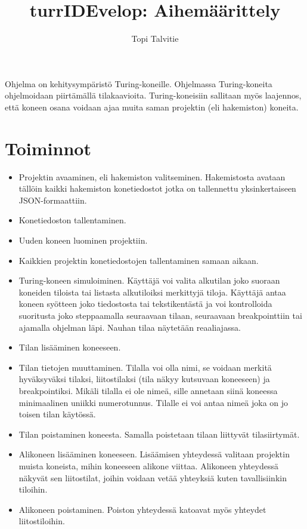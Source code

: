 \documentclass[a4paper, 11pt, finnish]{article}
\author{Topi Talvitie}
\title{turrIDEvelop: Aihemäärittely}
\begin{document}
\maketitle
Ohjelma on kehitysympäristö Turing-koneille. Ohjelmassa Turing-koneita
ohjelmoidaan piirtämällä tilakaavioita. Turing-koneisiin sallitaan myös
laajennos, että koneen osana voidaan ajaa muita saman projektin (eli
hakemiston) koneita.

\section*{Toiminnot}
\begin{itemize}
\item Projektin avaaminen, eli hakemiston valitseminen. Hakemistosta avataan
tällöin kaikki hakemiston konetiedostot jotka on tallennettu yksinkertaiseen
JSON-formaattiin.
\item Konetiedoston tallentaminen.
\item Uuden koneen luominen projektiin.
\item Kaikkien projektin konetiedostojen tallentaminen samaan aikaan.
\item Turing-koneen simuloiminen. Käyttäjä voi valita alkutilan joko suoraan
koneiden tiloista tai listasta alkutiloiksi merkittyjä tiloja.
Käyttäjä antaa koneen syötteen joko tiedostosta tai tekstikentästä ja voi
kontrolloida suoritusta joko steppaamalla seuraavaan tilaan, seuraavaan
breakpointtiin tai ajamalla ohjelman läpi. Nauhan tilaa näytetään reaaliajassa.
\item Tilan lisääminen koneeseen.
\item Tilan tietojen muuttaminen. Tilalla voi olla nimi, se voidaan merkitä
hyväksyväksi tilaksi, liitostilaksi (tila näkyy kutsuvaan koneeseen) ja
breakpointiksi. Mikäli tilalla ei ole nimeä, sille annetaan siinä koneessa
minimaalinen uniikki numerotunnus. Tilalle ei voi antaa nimeä joka on jo toisen
tilan käytössä.
\item Tilan poistaminen koneesta. Samalla poistetaan tilaan liittyvät
tilasiirtymät.
\item Alikoneen lisääminen koneeseen. Lisäämisen yhteydessä valitaan projektin
muista koneista, mihin koneeseen alikone viittaa. Alikoneen yhteydessä näkyvät
sen liitostilat, joihin voidaan vetää yhteyksiä kuten tavallisiinkin tiloihin.
\item Alikoneen poistaminen. Poiston yhteydessä katoavat myös yhteydet
liitostiloihin.
\end{itemize}
\end{document}
